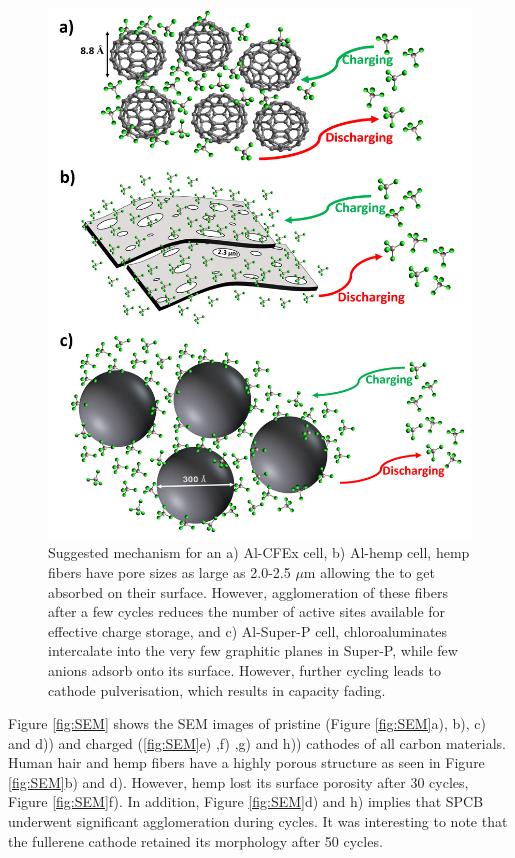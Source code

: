 \documentclass{article}
\begin{document}
\begin{figure}
  \centering
  \includegraphics[width=\textwidth]{fig/allmech}
    \caption{Suggested mechanism for an a) Al-CFEx cell, b) Al-hemp cell, hemp fibers have pore sizes as large as 2.0-2.5 $\mu$m allowing the  to get absorbed on their surface. However, agglomeration of these fibers after a few cycles reduces the number of active sites available for effective charge storage, and c) Al-Super-P cell, chloroaluminates intercalate into the very few graphitic planes in Super-P, while few anions adsorb onto its surface. However, further cycling leads to cathode pulverisation, which results in capacity fading.}
  \label{fig:allmech}
\end{figure}

Figure \ref{fig:SEM} shows the SEM images of pristine (Figure \ref{fig:SEM}a), b), c) and d)) and charged (\ref{fig:SEM}e) ,f) ,g) and h)) cathodes of all carbon materials. Human hair and hemp fibers have a highly porous structure as seen in Figure \ref{fig:SEM}b) and d). However, hemp lost its surface porosity after 30 cycles, Figure \ref{fig:SEM}f). In addition, Figure \ref{fig:SEM}d) and h) implies that SPCB underwent significant agglomeration during cycles. It was interesting to note that the fullerene cathode retained its morphology after 50 cycles. 
\end{document}
